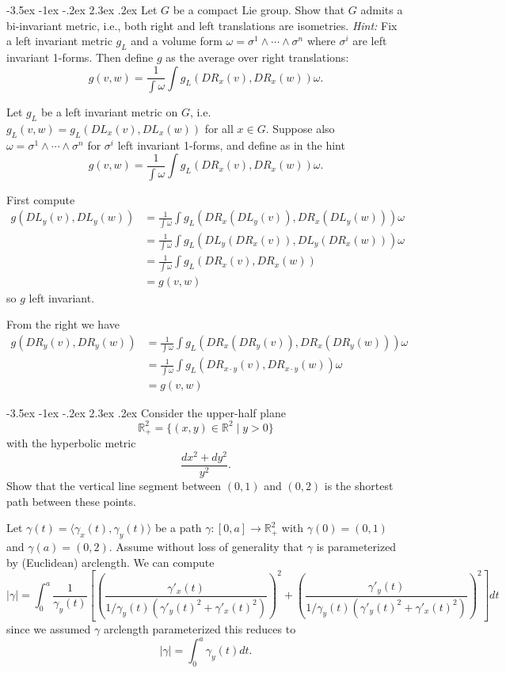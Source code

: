 \documentclass[10pt]{article}
\makeatletter
\renewcommand\section{\@startsection{section}{1}{\z@}%
                                  {-3.5ex \@plus -1ex \@minus -.2ex}%
                                  {2.3ex \@plus.2ex}%
                                  {\normalfont\large\bfseries}}
\newcommand{\R}{{\ensuremath{\mathbb{R}}} }
\newcommand{\hint}[1]{{\emph{Hint:} #1}} %
\makeatother
\begin{document}

\section{Let $G$ be a compact Lie group. Show that $G$ admits a bi-invariant metric, i.e., both right and left translations are isometries. \hint{Fix a left invariant metric $g_L$ and a volume form $\omega = \sigma^1 \wedge \cdots \wedge \sigma^n$ where $\sigma^i$ are left invariant 1-forms. Then define $g$ as the average over right translations: $$g(v,w) = \frac{1}{\int \omega} \int g_L (DR_x (v) , DR_x(w)) \omega.$$}}

Let $g_L$ be a left invariant metric on $G$, i.e. $g_L(v,w) = g_L(DL_x (v) , DL_x(w) ) $ for all $x \in G$. Suppose also $ \omega = \sigma^1 \wedge \cdots \wedge \sigma^n$ for  $\sigma^i$   left invariant 1-forms, and define as in the hint
\[g(v,w) = \frac{1}{\int \omega} \int g_L (DR_x (v) , DR_x(w)) \omega.\]

First compute
\begin{align*}g( DL_y(v),DL_y(w)) &= \frac{1}{\int \omega} \int g_L (DR_x (DL_y(v)) , DR_x(DL_y(w))) \omega \\ &= \frac{1}{\int \omega} \int g_L (DL_y(DR_x (v)) , DL_y(DR_x(w))) \omega\\ &= \frac{1}{\int \omega} \int g_L ( DR_x (v) ,DR_x(w)) \\&= g(v,w) \end{align*}
so $g$ left invariant.

From the right we have
\begin{align*}g( DR_y(v),DR_y(w)) &= \frac{1}{\int \omega} \int g_L (DR_x (DR_y(v)) , DR_x(DR_y(w))) \omega \\ &= \frac{1}{\int \omega} \int g_L (DR_{x \cdot y}(v) , DR_{x\cdot y}(w)) \omega\\ &= g(v,w)  \end{align*}


\section{Consider the upper-half plane $$\R^2_+  = \{ (x,y) \in \R^2 \mid y > 0 \}$$ with the hyperbolic metric $$\frac{dx^2 + dy^2}{y^2}.$$ Show that  the vertical line segment between $(0,1)$ and $(0,2)$ is the shortest path between these points.}

Let $\gamma(t) = \langle \gamma_x(t), \gamma_y(t) \rangle$ be a path $\gamma:[0,a]\to \R_+^2$ with $\gamma(0) = (0,1)$ and $\gamma(a) = (0,2)$. Assume without loss of generality that $\gamma$ is parameterized by (Euclidean) arclength. We can compute
\[|\gamma| = \int_0^a  \frac{1}{\gamma_y(t)} \left[ \left( \frac{\gamma'_x(t)}{1/\gamma_y(t) \left(  \gamma'_y(t)^2 + \gamma'_x(t)^2 \right)} \right) ^2 +  \left( \frac{\gamma'_y(t)}{1/\gamma_y(t) \left(  \gamma'_y(t)^2 + \gamma'_x(t)^2 \right)} \right) ^2 \right] dt \]
since we assumed $\gamma$ arclength parameterized this reduces to
\[|\gamma| = \int_0^a \gamma_y(t) dt.\]
\end{document}
